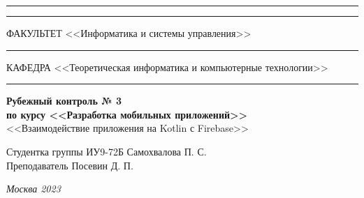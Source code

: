 \documentclass[a4paper, 14pt]{extarticle}
\begin{document}
\begin{titlepage}
\vspace{-25pt}
\hspace{-35pt}\rule{\textwidth}{2.3pt}

\vspace*{-20.3pt}
\hspace{-35pt}\rule{\textwidth}{0.4pt}

\vspace{1.5ex}
\hspace{-35pt} \noindent \small ФАКУЛЬТЕТ\hspace{80pt} <<Информатика и системы управления>>

\vspace*{-16pt}
\hspace{47pt}\rule{0.83\textwidth}{0.4pt}

\vspace{0.5ex}
\hspace{-35pt} \noindent \small КАФЕДРА\hspace{50pt} <<Теоретическая информатика и компьютерные технологии>>

\vspace*{-16pt}
\hspace{30pt}\rule{0.866\textwidth}{0.4pt}

\vspace{11em}

\begin{center}
\Large {\bf Рубежный контроль № 3} \\
\large {\bf по курсу <<Разработка мобильных приложений>>} \\
\large <<Взаимодействие приложения на Kotlin с Firebase>>
\end{center}\normalsize

\vspace{8em}


\begin{flushright}
  {Студентка группы ИУ9-72Б Самохвалова П. С. \hspace*{15pt}\\
  \vspace{2ex}
  Преподаватель Посевин Д. П.\hspace*{15pt}}
\end{flushright}

\bigskip

\vfill


\begin{center}
\textsl{Москва 2023}
\end{center}
\end{titlepage}
\end{document}
